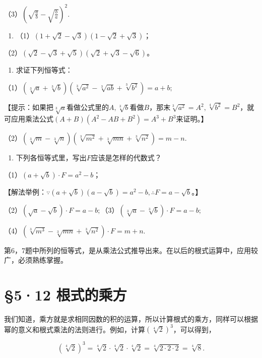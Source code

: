 （3）\(\left(\sqrt{\frac{a}{b}} - \sqrt{\frac{b}{a}}\right)^2.\)

\begin{enumerate}[start=5]
\item
  （1）\((1 + \sqrt{2} - \sqrt{3})(1 - \sqrt{2} + \sqrt{3})\)；
\end{enumerate}

（2）\((\sqrt{2} - \sqrt{3} + \sqrt{5})(\sqrt{2} + \sqrt{3} - \sqrt{6})\)。

\begin{enumerate}[start=6]
\item
  求证下列恒等式：
\end{enumerate}

（1）\((\sqrt[3]{a} + \sqrt[3]{b})(\sqrt[3]{a^2} - \sqrt[3]{ab} + \sqrt[3]{b^2}) = a + b;\)

【提示：如果把\(\sqrt[3]{a}\)看做公式里的\(A, \sqrt[3]{b}\)看做\(B\)，那末\(\sqrt[3]{a^2} = A^2, \sqrt[4]{b^2} = B^2\)，就可应用乘法公式\((A + B)(A^2 - AB + B^2) = A^3 + B^3\)来证明。】

（2）\((\sqrt[3]{m} - \sqrt[3]{n})(\sqrt[3]{m^2} + \sqrt[3]{mn} + \sqrt[3]{n^2}) = m - n.\)

\begin{enumerate}[start=7]
\item
  下列各恒等式里，写出\(F\)应该是怎样的代数式？
\end{enumerate}

（1）\((a + \sqrt{b}) \cdot F = a^2 - b\)；

【解法举例：\(\because (a + \sqrt{b})(a - \sqrt{b}) = a^2 - b, \therefore F = a - \sqrt{b}\)。】

（2）\((\sqrt{a} - \sqrt{b}) \cdot F = a - b;\)（3）\((\sqrt[3]{a} - \sqrt[3]{b}) \cdot F = a - b;\)

（4）\((\sqrt[3]{m^3} - \sqrt[3]{mn} + \sqrt[3]{n^2}) \cdot F = m + n.\)

第6，7题中所列的恒等式，是从乘法公式推导出来。在以后的根式运算中，应用较广，必须熟练掌握。

\section{§5·12 根式的乘方}

我们知道，乘方就是求相同因数的积的运算，所以计算根式的乘方，同样可以根据幂的意义和根式乘法的法则进行。例如，计算\((\sqrt[4]{2})^3\)，可以得到，

\[
(\sqrt[4]{2}) ^ {3} = \sqrt[4]{2} \cdot \sqrt[4]{2} \cdot \sqrt[4]{2} = \sqrt[4]{2 \cdot 2 \cdot 2} = \sqrt[4]{8}.
\]

